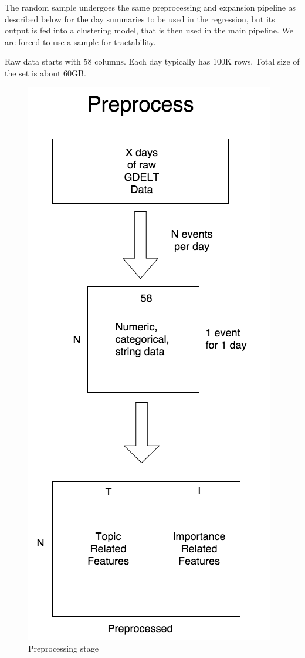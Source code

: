 The random sample undergoes the same preprocessing and expansion pipeline as described below for the day summaries to be used in the regression, but its output is fed into a clustering model, that is then used in the main pipeline. We are forced to use a sample for tractability.

Raw data starts with 58 columns. Each day typically has 100K rows. Total size of the set is about 60GB. %

\begin{figure}[ht]
\vskip 0.2in
\begin{center}
\centerline{\includegraphics[scale=0.15]{images/preprocess_vertical.png}}
\caption{Preprocessing stage}
\end{center}
\vskip -0.2in
\label{fig:preprocess}
\end{figure}

